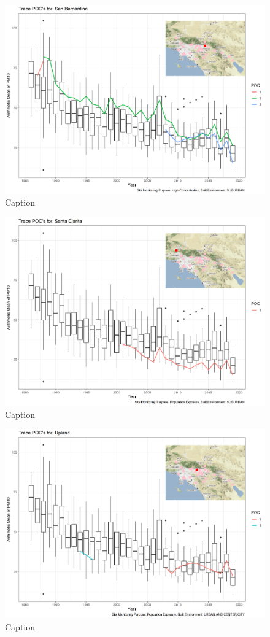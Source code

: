 \begin{figure}
    \centering
    \includegraphics[width = \textwidth]{Figures/IndividualSiteTraces/TracePOC_San Bernardino.png}
    \caption{Caption}
    \label{fig:my_label}
\end{figure}

\begin{figure}
    \centering
    \includegraphics[width = \textwidth]{Figures/IndividualSiteTraces/TracePOC_Santa Clarita.png}
    \caption{Caption}
    \label{fig:my_label}
\end{figure}

\begin{figure}
    \centering
    \includegraphics[width = \textwidth]{Figures/IndividualSiteTraces/TracePOC_Upland.png}
    \caption{Caption}
    \label{fig:my_label}
\end{figure}
